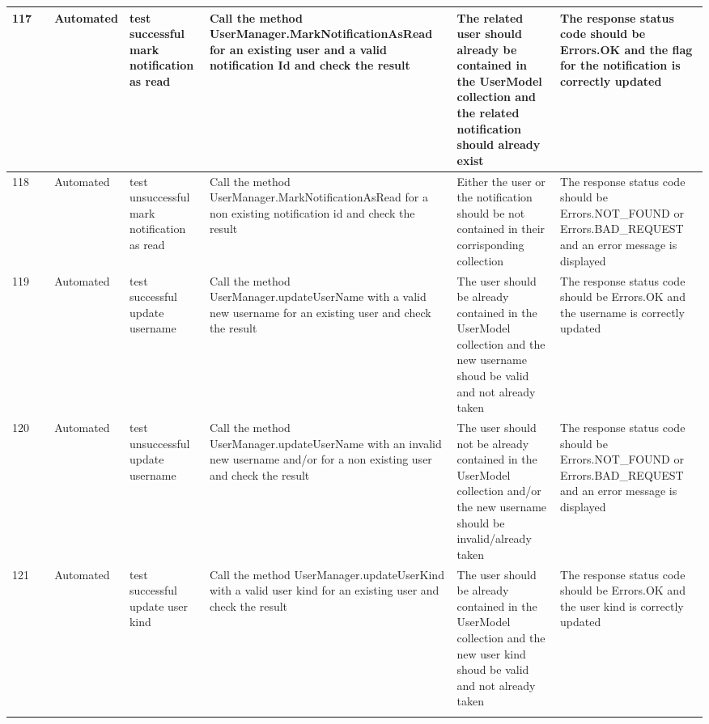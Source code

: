 \documentclass{article}
\begin{document}
{\begin{tabular}{|
    >{\columncolor[HTML]{FFFFFF}}l |
    >{\columncolor[HTML]{FFFFFF}}c |
    >{\columncolor[HTML]{FFFFFF}}l |l|l|l|l|}
    117                                 & \cellcolor[HTML]{FFFFFF}                                                     & {\color[HTML]{11734B} Automated} & test successful mark notification as read   & Call the method UserManager.MarkNotificationAsRead for an existing user and a valid notification Id and check the result    & The related user should already be contained in the UserModel collection and the related notification should already exist   & The response status code should be Errors.OK and the flag for the notification is correctly updated           \\ \cline{1-1} \cline{3-7} 
    118                                 & \cellcolor[HTML]{FFFFFF}                                                     & {\color[HTML]{11734B} Automated} & test unsuccessful mark notification as read & Call the method UserManager.MarkNotificationAsRead for a non existing notification id and check the result                  & Either the user or the notification should be not contained in their corrisponding collection                                & The response status code should be Errors.NOT\_FOUND or Errors.BAD\_REQUEST and an error message is displayed \\ \cline{1-1} \cline{3-7} 
    119                                 & \cellcolor[HTML]{FFFFFF}                                                     & {\color[HTML]{11734B} Automated} & test successful update username             & Call the method UserManager.updateUserName with a valid new username for an existing user and check the result              & The user should be already contained in the UserModel collection and the new username shoud be valid and not already taken   & The response status code should be Errors.OK and the username is correctly updated                            \\ \cline{1-1} \cline{3-7} 
    120                                 & \cellcolor[HTML]{FFFFFF}                                                     & {\color[HTML]{11734B} Automated} & test unsuccessful update username           & Call the method UserManager.updateUserName with an invalid new username and/or for a non existing user and check the result & The user should not be already contained in the UserModel collection and/or the new username should be invalid/already taken & The response status code should be Errors.NOT\_FOUND or Errors.BAD\_REQUEST and an error message is displayed \\ \cline{1-1} \cline{3-7} 
    121                                 & \cellcolor[HTML]{FFFFFF}                                                     & {\color[HTML]{11734B} Automated} & test successful update user kind            & Call the method UserManager.updateUserKind with a valid user kind for an existing user and check the result                 & The user should be already contained in the UserModel collection and the new user kind shoud be valid and not already taken  & The response status code should be Errors.OK and the user kind is correctly updated                           \\ \cline{1-1} \cline{3-7} 

\end{tabular}}
\end{document}
